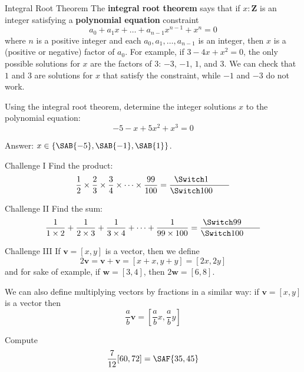 \documentclass[12pt,letterpaper]{article}
\begin{document}
\begin{problem}{Integral Root Theorem}
  The \textbf{integral root theorem} says that if \(x: \mathbf{Z}\) is an integer satisfying
  a \textbf{polynomial equation} constraint \[
    a_0 + a_1 x + \dots + a_{n-1} x^{n-1} + x^n = 0
  \] where \(n\) is a positive integer and each \(a_0, a_1, \dots, a_{n-1}\) is an integer,
  then \(x\) is a (positive or negative) factor of \(a_0\).  For example, if \(3 - 4x + x^2 =
  0\), the only possible solutions for \(x\) are the factors of \(3\): \(-3\), \(-1\),
  \(1\), and \(3\). We can check that \(1\) and \(3\) are solutions for \(x\) that satisfy
  the constraint, while \(-1\) and \(-3\) do not work.

  Using the integral root theorem, determine the integer solutions \(x\) to the polynomial
  equation: \[
    -5 - x + 5x^2 + x^3 = 0
  \]

  Answer: \(x \in \{\SAB{-5}, \SAB{-1}, \SAB{1}\}\).
\end{problem}

\begin{problem}{Challenge I}
 Find the product:
 \[
  \frac{1}{2} \times \frac{2}{3} \times \frac{3}{4} \times
  \dots \times \frac{99}{100} = \fracans{1}{100}
 \]
\end{problem}

\begin{problem}{Challenge II}
 Find the sum:
 \[
  \frac{1}{1 \times 2} + \frac{1}{2 \times 3} + \frac{1}{3 \times 4}
  + \dots + \frac{1}{99 \times 100} = \fracans{99}{100}
 \]
\end{problem}

\begin{problem}{Challenge III}
  If \(\mathbf{v} = [x, y]\) is a vector, then we
  define \[
    2\mathbf{v} = \mathbf{v} + \mathbf{v} = [x + x, y + y] = [2x, 2y]
  \] and for sake of example, if \(\mathbf{w} = [3, 4]\), then
  \(2\mathbf{w} = [6, 8]\).

  We can also define multiplying vectors by fractions in a similar way: if
  \(\mathbf{v} = [x, y]\) is a vector then \[
    \frac{a}{b} \mathbf{v} = \left[\frac{a}{b}x, \frac{a}{b}y\right]
  \]

  Compute \[
    \frac{7}{12} [60, 72] = \SAF{35, 45}
  \]
\end{problem}
\end{document}
